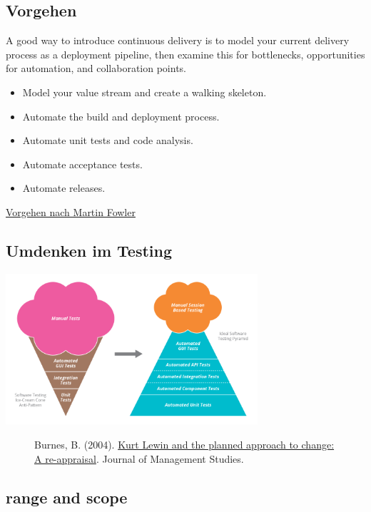 \documentclass[a4paper]{article}
\begin{document}
\subsection{Vorgehen}
A good way to introduce continuous delivery is to model your current delivery process as a deployment pipeline, then examine this for bottlenecks, opportunities for automation, and collaboration points.
\begin{itemize}[label={$\bullet$}]
\item Model your value stream and create a walking skeleton.
\item Automate the build and deployment process.
\item Automate unit tests and code analysis.
\item Automate acceptance tests.
\item Automate releases.
\end{itemize}

\href{http://www.informit.com/articles/article.aspx?p=1621865&seqNum=8}{Vorgehen nach Martin Fowler}

\subsection{Umdenken im Testing}
\centering
\includegraphics[width=0.7\textwidth]{pictures/TestPyramid.png}
\vfill
\begin{figure}[!b]
  Burnes, B. (2004). \href{http://doi.org/10.1111/j.1467-6486.2004.00463.x}{Kurt Lewin and the planned approach to change: A re-appraisal}. Journal of Management Studies.
\end{figure}


\subsection{range and scope}
\centering
{}
\end{document}
